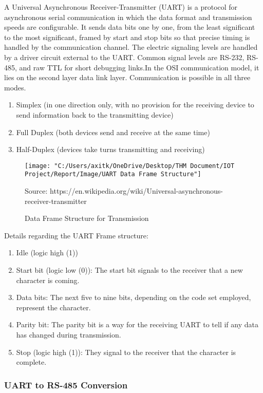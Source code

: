 \documentclass{article}
\begin{document}
	A Universal Asynchronous Receiver-Transmitter (UART) is a protocol for asynchronous serial communication in which the data format and transmission speeds are configurable. It sends data bits one by one, from the least significant to the most significant, framed by start and stop bits so that precise timing is handled by the communication channel. 
	\newline The electric signaling levels are handled by a driver circuit external to the UART. Common signal levels are RS-232, RS-485, and raw TTL for short debugging links.In the OSI communication model, it lies on the second layer data link layer. Communication is possible in all three modes.
	\begin{enumerate}
		\item Simplex (in one direction only, with no provision for the receiving device to send information back to the transmitting device)
		\item Full Duplex (both devices send and receive at the same time)
		\item Half-Duplex (devices take turns transmitting and receiving)
	\end{enumerate}
	
	\begin{figure}[h]
		\centering
		\texttt{[image: "C:/Users/axitk/OneDrive/Desktop/THM Document/IOT Project/Report/Image/UART Data Frame Structure"]}
		\caption{Data Frame Structure for Transmission}
		\small Source:  https://en.wikipedia.org/wiki/Universal-asynchronous-receiver-transmitter
	\end{figure}
	
	Details regarding the UART Frame structure:
	\begin{enumerate}
		\item Idle (logic high (1))
		\item Start bit (logic low (0)): The start bit signals to the receiver that a new character is coming.
		\item Data bits: The next five to nine bits, depending on the code set employed, represent the character.
		\item Parity bit: The parity bit is a way for the receiving UART to tell if any data has changed during transmission.
		\item Stop (logic high (1)): They signal to the receiver that the character is complete.
	\end{enumerate}
	
	\subsubsection{UART to RS-485 Conversion}
	
\end{document}
